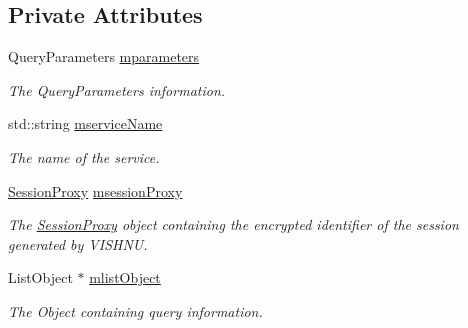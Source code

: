 \subsection*{Private Attributes}
\begin{DoxyCompactItemize}
\item 
\hypertarget{classQueryProxy_a3356a46862004eca747ba5906cd97caf}{
QueryParameters \hyperlink{classQueryProxy_a3356a46862004eca747ba5906cd97caf}{mparameters}}
\label{classQueryProxy_a3356a46862004eca747ba5906cd97caf}

\begin{DoxyCompactList}\small\item\em The QueryParameters information. \item\end{DoxyCompactList}\item 
\hypertarget{classQueryProxy_a143d428a2f44017ffe449870def293d2}{
std::string \hyperlink{classQueryProxy_a143d428a2f44017ffe449870def293d2}{mserviceName}}
\label{classQueryProxy_a143d428a2f44017ffe449870def293d2}

\begin{DoxyCompactList}\small\item\em The name of the service. \item\end{DoxyCompactList}\item 
\hypertarget{classQueryProxy_aab14967c9314295c14e90e7f01c22a78}{
\hyperlink{classSessionProxy}{SessionProxy} \hyperlink{classQueryProxy_aab14967c9314295c14e90e7f01c22a78}{msessionProxy}}
\label{classQueryProxy_aab14967c9314295c14e90e7f01c22a78}

\begin{DoxyCompactList}\small\item\em The \hyperlink{classSessionProxy}{SessionProxy} object containing the encrypted identifier of the session generated by VISHNU. \item\end{DoxyCompactList}\item 
\hypertarget{classQueryProxy_af3dcf0bbbaee6e544e4ab0ce839eaa44}{
ListObject $\ast$ \hyperlink{classQueryProxy_af3dcf0bbbaee6e544e4ab0ce839eaa44}{mlistObject}}
\label{classQueryProxy_af3dcf0bbbaee6e544e4ab0ce839eaa44}

\begin{DoxyCompactList}\small\item\em The Object containing query information. \item\end{DoxyCompactList}\end{DoxyCompactItemize}



